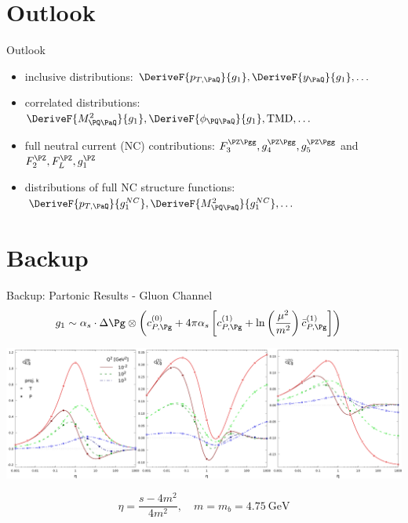 \section{Outlook}
\begin{frame}{Outlook}
\begin{itemize}
\item inclusive distributions: $\DeriveF{{p_{T,\PaQ}}}{g_1},\DeriveF{{y_{\PaQ}}}{g_1}, \ldots$ 
\item correlated distributions: $\DeriveF{{M_{\PQ\PaQ}^2}}{g_1}, \DeriveF{\phi_{\PQ\PaQ}}{g_1}, \text{TMD}, \ldots$ 
\item<2-> full neutral current (NC) contributions: $F_3^{\PZ\Pgg}, g_4^{\PZ\Pgg}, g_5^{\PZ\Pgg}$ and $F_2^{\PZ}, F_L^{\PZ}, g_1^{\PZ}$
\item<2-> distributions of full NC structure functions: $\DeriveF{p_{T,\PaQ}}{g_1^{NC}},\DeriveF{{M_{\PQ\PaQ}^2}}{g_1^{NC}}, \ldots$
\end{itemize}

\end{frame}

\section*{Backup}

\begin{frame}{Backup: Partonic Results - Gluon Channel}
\begin{align*}
g_1 &\sim \alpha_s\cdot\Delta \Pg \otimes \left(c_{P,\Pg}^{(0)} + 4\pi\alpha_s\left[c_{P,\Pg}^{(1)} + \ln\left(\frac{\mu^2}{m^2}\right)\bar c_{P,\Pg}^{(1)}\right]\right)
\end{align*}
\begin{center}
\includegraphics[width=\textwidth]{img/cgTP}
\end{center}
\[\eta = \frac{s-4m^2}{4m^2},\quad m=m_b=\SI{4.75}{\GeV}\]
\end{frame}

